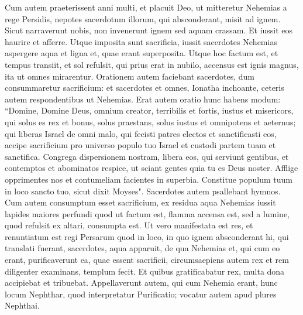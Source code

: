 \begin{biblechapter}
\verse Cum autem praeterissent anni multi, et placuit Deo, ut mitteretur Nehemias a rege Persidis, nepotes sacerdotum illorum, qui absconderant, misit ad ignem. 
\verse Sicut narraverunt nobis, non invenerunt ignem sed aquam crassam. Et iussit eos haurire et afferre. Utque imposita sunt sacrificia, iussit sacerdotes Nehemias aspergere aqua et ligna et, quae erant superposita. 
\verse Utque hoc factum est, et tempus transiit, et sol refulsit, qui prius erat in nubilo, accensus est ignis magnus, ita ut omnes mirarentur. 
\verse Orationem autem faciebant sacerdotes, dum consummaretur sacrificium: et sacerdotes et omnes, Ionatha inchoante, ceteris autem respondentibus ut Nehemias. 
\verse Erat autem oratio hunc habens modum: “Domine, Domine Deus, omnium creator, terribilis et fortis, iustus et misericors, qui solus es rex et bonus, 
\verse solus praestans, solus iustus et omnipotens et aeternus; qui liberas Israel de omni malo, qui fecisti patres electos et sanctificasti eos, 
\verse accipe sacrificium pro universo populo tuo Israel et custodi partem tuam et sanctifica.  
\verse Congrega dispersionem nostram, libera eos, qui serviunt gentibus, et contemptos et abominatos respice, ut sciant gentes quia tu es Deus noster.  
\verse Afflige opprimentes nos et contumeliam facientes in superbia. 
\verse Constitue populum tuum in loco sancto tuo, sicut dixit Moyses". 
\verse Sacerdotes autem psallebant hymnos. 
\verse Cum autem consumptum esset sacrificium, ex residua aqua Nehemias iussit lapides maiores perfundi 
\verse quod ut factum est, flamma accensa est, sed a lumine, quod refulsit ex altari, consumpta est. 
\verse Ut vero manifestata est res, et renuntiatum est regi Persarum quod in loco, in quo ignem absconderant hi, qui translati fuerant, sacerdotes, aqua apparuit, de qua Nehemias et, qui cum eo erant, purificaverunt ea, quae essent sacrificii, 
\verse circumsaepiens autem rex et rem diligenter examinans, templum fecit. 
\verse Et quibus gratificabatur rex, multa dona accipiebat et tribuebat. 
\verse Appellaverunt autem, qui cum Nehemia erant, hunc locum Nephthar, quod interpretatur Purificatio; vocatur autem apud plures Nephthai. 
\end{biblechapter}

